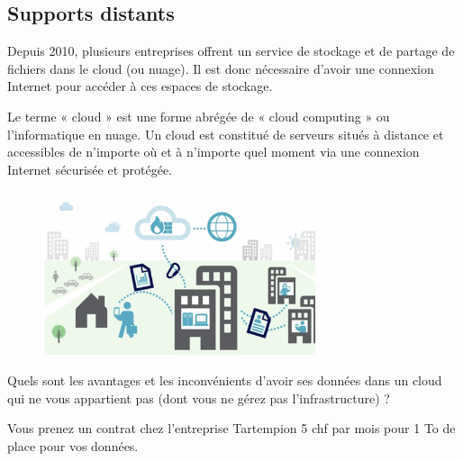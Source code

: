 \documentclass[11pt, a4paper]{book}
\begin{document}
\subsection{Supports distants}
Depuis 2010, plusieurs entreprises offrent un service de stockage et de partage de fichiers dans le cloud (ou nuage). Il est donc nécessaire d’avoir une connexion Internet pour accéder à ces espaces de stockage.

\begin{remarques}
Le terme « cloud » est une forme abrégée de « cloud computing » ou l’informatique en nuage. Un cloud est constitué de serveurs situés à distance et accessibles de n’importe où et à n’importe quel moment via une connexion Internet sécurisée et protégée.
\end{remarques}

\begin{figure}[ht!]
\centering
\includegraphics[width=8cm]{images/Business_Network_Solutions_swisscom.png}
\end{figure}

Quels sont les avantages et les inconvénients d’avoir ses données dans un cloud qui ne vous appartient pas (dont vous ne gérez pas l’infrastructure) ?

\begin{example} Vous prenez un contrat chez l’entreprise Tartempion 5 chf par mois pour 1 To de place pour vos données.
\end{example}
\end{document}
